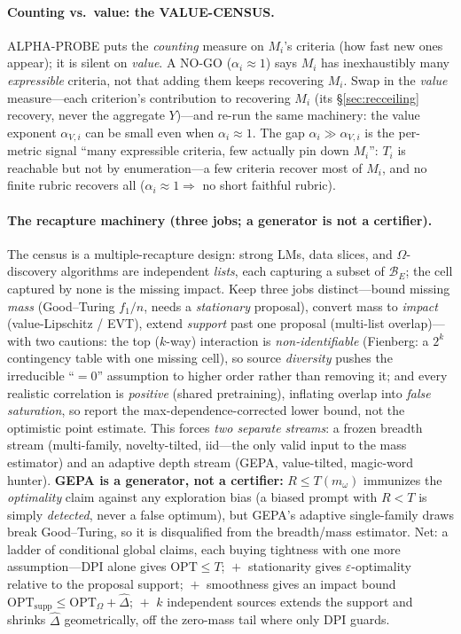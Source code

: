\documentclass[11pt]{article}
\newcommand{\Bset}{\mathcal{B}_E}
\newcommand{\Om}{\Omega}
\newcommand{\Mw}{m_\omega}
\begin{document}
\paragraph{Counting vs.\ value: the VALUE-CENSUS.} ALPHA-PROBE puts the \emph{counting} measure on $M_i$'s
criteria (how fast new ones appear); it is silent on \emph{value}. A NO-GO ($\alpha_i\approx1$) says $M_i$ has
inexhaustibly many \emph{expressible} criteria, not that adding them keeps recovering $M_i$. Swap in the
\emph{value} measure---each criterion's contribution to recovering $M_i$ (its \S\ref{sec:recceiling} recovery,
never the aggregate $Y$)---and re-run the same machinery: the value exponent $\alpha_{V,i}$ can be small even
when $\alpha_i\approx1$. The gap $\alpha_i\gg\alpha_{V,i}$ is the per-metric signal ``many expressible criteria,
few actually pin down $M_i$'': $T_i$ is reachable but not by enumeration---a few criteria recover most of $M_i$,
and no finite rubric recovers all ($\alpha_i\approx1\Rightarrow$ no short faithful rubric).

\paragraph{The recapture machinery (three jobs; a generator is not a certifier).} The census is a
multiple-recapture design: strong LMs, data slices, and $\Om$-discovery algorithms are independent
\emph{lists}, each capturing a subset of $\Bset$; the cell captured by none is the missing impact. Keep three
jobs distinct---bound missing \emph{mass} (Good--Turing $f_1/n$, needs a \emph{stationary} proposal), convert
mass to \emph{impact} (value-Lipschitz / EVT), extend \emph{support} past one proposal (multi-list
overlap)---with two cautions: the top ($k$-way) interaction is \emph{non-identifiable} (Fienberg: a $2^k$
contingency table with one missing cell), so source \emph{diversity} pushes the irreducible ``$=0$'' assumption
to higher order rather than removing it; and every realistic correlation is \emph{positive} (shared
pretraining), inflating overlap into \emph{false saturation}, so report the max-dependence-corrected lower
bound, not the optimistic point estimate. This forces \emph{two separate streams}: a frozen breadth stream
(multi-family, novelty-tilted, iid---the only valid input to the mass estimator) and an adaptive depth stream
(GEPA, value-tilted, magic-word hunter). \textbf{GEPA is a generator, not a certifier:} $R\le T(\Mw)$
immunizes the \emph{optimality} claim against any exploration bias (a biased prompt with $R<T$ is simply
\emph{detected}, never a false optimum), but GEPA's adaptive single-family draws break Good--Turing, so it is
disqualified from the breadth/mass estimator. Net: a ladder of conditional global claims, each buying tightness
with one more assumption---DPI alone gives $\mathrm{OPT}\le T$; ${}+{}$ stationarity gives
$\varepsilon$-optimality relative to the proposal support; ${}+{}$ smoothness gives an impact bound
$\mathrm{OPT}_{\mathrm{supp}}\le\mathrm{OPT}_\Om+\hat\Delta$; ${}+{}$ $k$ independent sources extends the
support and shrinks $\hat\Delta$ geometrically, off the zero-mass tail where only DPI guards.
\end{document}

